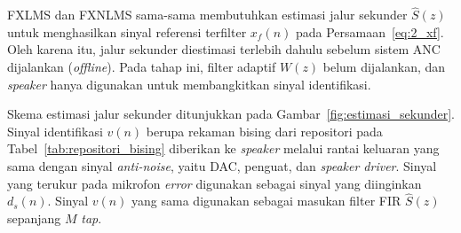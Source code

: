 FXLMS dan FXNLMS sama-sama membutuhkan estimasi jalur sekunder $\hat{S}(z)$ untuk menghasilkan sinyal referensi terfilter $x_f(n)$ pada Persamaan~\eqref{eq:2_xf}. Oleh karena itu, jalur sekunder diestimasi terlebih dahulu sebelum sistem ANC dijalankan (\emph{offline}). Pada tahap ini, filter adaptif $W(z)$ belum dijalankan, dan \emph{speaker} hanya digunakan untuk membangkitkan sinyal identifikasi.

Skema estimasi jalur sekunder ditunjukkan pada Gambar~\ref{fig:estimasi_sekunder}. Sinyal identifikasi $v(n)$ berupa rekaman bising dari repositori pada Tabel~\ref{tab:repositori_bising} diberikan ke \emph{speaker} melalui rantai keluaran yang sama dengan sinyal \emph{anti-noise}, yaitu DAC, penguat, dan \emph{speaker driver}. Sinyal yang terukur pada mikrofon \emph{error} digunakan sebagai sinyal yang diinginkan $d_s(n)$. Sinyal $v(n)$ yang sama digunakan sebagai masukan filter FIR $\hat{S}(z)$ sepanjang $M$ \emph{tap}.

